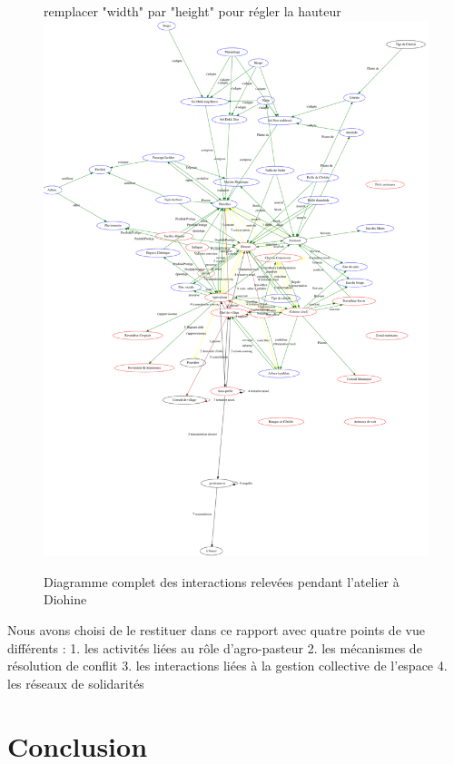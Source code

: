 \begin{figure}
\begin{center}
remplacer "width" par "height" pour régler la hauteur
\includegraphics[width=15cm]{img/pardi_fdp.png}
\end{center}
\caption{Diagramme complet des interactions relevées pendant l'atelier à Diohine }
\label{diag_complet}
\end{figure}




Nous avons choisi de le restituer dans ce rapport avec quatre points de vue différents : 
1. les activités liées au rôle d'agro-pasteur
2. les mécanismes de résolution de conflit
3. les interactions liées à la gestion collective de l'espace
4. les réseaux de solidarités


\section{Conclusion}

